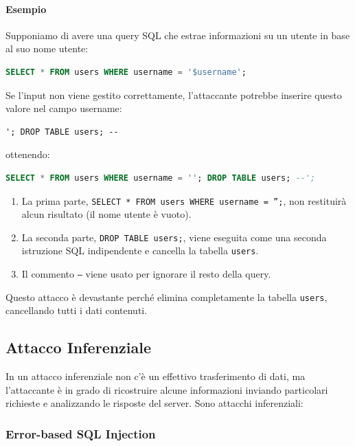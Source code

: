 \paragraph{Esempio} Supponiamo di avere una query SQL che estrae informazioni su un utente in base al suo nome utente:

\begin{lstlisting}[language=SQL]
SELECT * FROM users WHERE username = '$username';
\end{lstlisting}

Se l'input non viene gestito correttamente, l'attaccante potrebbe inserire questo valore nel campo username:

\begin{verbatim}
'; DROP TABLE users; --
\end{verbatim}

ottenendo:

\begin{lstlisting}[language=SQL]
SELECT * FROM users WHERE username = ''; DROP TABLE users; --';
\end{lstlisting}

\begin{enumerate}
    \item La prima parte, \texttt{SELECT * FROM users WHERE username = '';}, non restituirà alcun risultato (il nome utente è vuoto).
    \item La seconda parte, \texttt{DROP TABLE users;}, viene eseguita come una seconda istruzione SQL indipendente e cancella la tabella \texttt{users}.
    \item Il commento \texttt{--} viene usato per ignorare il resto della query.
\end{enumerate}

Questo attacco è devastante perché elimina completamente la tabella \texttt{users}, cancellando tutti i dati contenuti.

\subsection{Attacco Inferenziale}

In un attacco inferenziale non c'è un effettivo trasferimento di dati, ma l'attaccante è in grado di ricostruire alcune informazioni inviando particolari richieste e analizzando le risposte del server. Sono attacchi inferenziali:

\subsubsection{Error-based SQL Injection}

